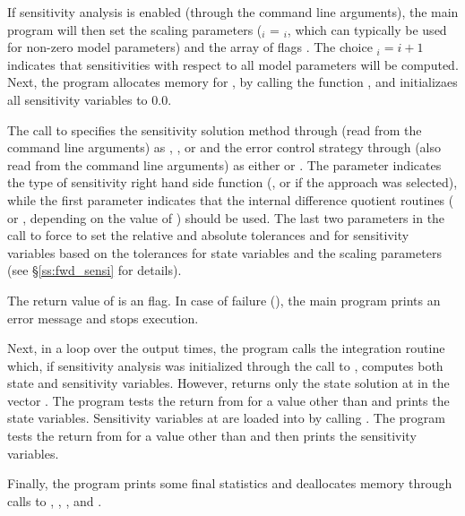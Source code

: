 If sensitivity analysis is enabled (through the command line arguments), 
the main program will then set the scaling parameters
 ($_i$ = $_i$, which can typically be used for 
non-zero model parameters) and the array of flags . The choice $_i=i+1$
indicates that sensitivities with respect to all model parameters will be computed.
Next, the program allocates memory for , by calling the {\nvector} function 
, and initializaes all sensitivity variables to $0.0$.

The call to  specifies the sensitivity solution method through 
 (read from the command line arguments) as , 
, or  and the error control strategy through 
(also read from the command line arguments) as either  or .
The  parameter indicates the type of sensitivity right hand side function
(, or  if the  approach was selected),
while the first  parameter indicates that the {\cvodes} internal difference quotient 
routines ( or , depending on the value of )
should be used. The last two  parameters in the call to 
force {\cvodes} to set the relative and absolute
tolerances  and  for sensitivity variables based on the tolerances for 
state variables and the scaling parameters  (see \S\ref{ss:fwd_sensi} for details).

The return value of  is an  flag. In case of failure
(), the main program prints an error message and stops execution.

Next, in a loop over the  output times, the program calls the integration
routine  which, if sensitivity analysis was initialized through the call
to , computes both state and sensitivity variables. However,
 returns only the state solution at  in the vector .
The program tests the return from  for a value other than  and
prints the state variables.
Sensitivity variables at  are loaded into  by calling .
The program tests the return from  for a value other than  
and then prints the sensitivity variables.

Finally, the program prints some final statistics and deallocates memory through calls
to , , , and .

